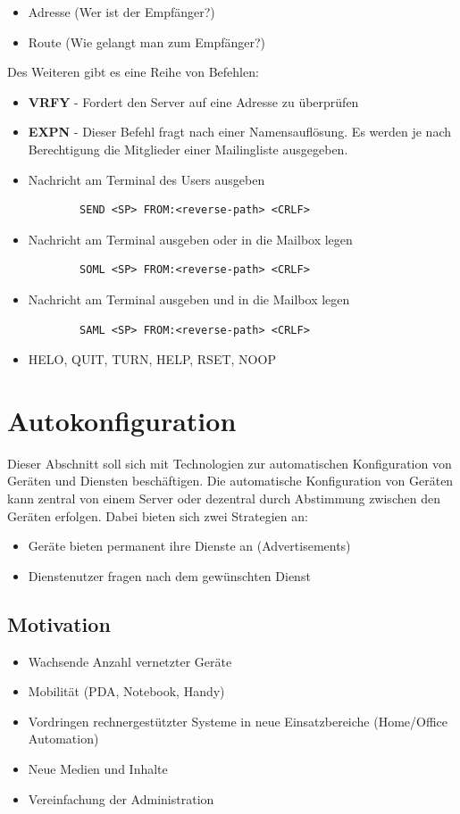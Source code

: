 \documentclass{article} %
\begin{document}
	\begin{itemize}
	\item Adresse (Wer ist der Empfänger?) 
	\item Route (Wie gelangt man zum Empfänger?) 
	\end{itemize}
Des Weiteren gibt es eine Reihe von Befehlen:
	\begin{itemize}
	\item \textbf{VRFY} - Fordert den Server auf eine Adresse zu überprüfen
	\item \textbf{EXPN} - Dieser Befehl fragt nach einer Namensauflösung. Es werden je nach Berechtigung die Mitglieder einer Mailingliste ausgegeben.
	\item Nachricht am Terminal des Users ausgeben
		\begin{verbatim}
		SEND <SP> FROM:<reverse-path> <CRLF>
		\end{verbatim}
	\item Nachricht am Terminal ausgeben oder in die Mailbox legen
		\begin{verbatim}
		SOML <SP> FROM:<reverse-path> <CRLF> 
		\end{verbatim}
	\item Nachricht am Terminal ausgeben und in die Mailbox legen
		\begin{verbatim}
		SAML <SP> FROM:<reverse-path> <CRLF>
		\end{verbatim}
	\item HELO, QUIT, TURN, HELP, RSET, NOOP		
	\end{itemize}

\section{Autokonfiguration}
Dieser Abschnitt soll sich mit Technologien zur automatischen Konfiguration von Geräten und Diensten beschäftigen. Die automatische Konfiguration von Geräten kann zentral von einem Server oder dezentral durch Abstimmung zwischen den Geräten erfolgen. Dabei bieten sich zwei Strategien an:
	\begin{itemize}
	\item Geräte bieten permanent ihre Dienste an (Advertisements)
	\item Dienstenutzer fragen nach dem gewünschten Dienst
	\end{itemize}
\subsection{Motivation}
 	\begin{itemize}
	\item Wachsende Anzahl vernetzter Geräte
	\item Mobilität (PDA, Notebook, Handy)
	\item Vordringen rechnergestützter Systeme in neue Einsatzbereiche (Home/Office Automation)
	\item Neue Medien und Inhalte
	\item Vereinfachung der Administration
	\end{itemize}
	
\end{document}
